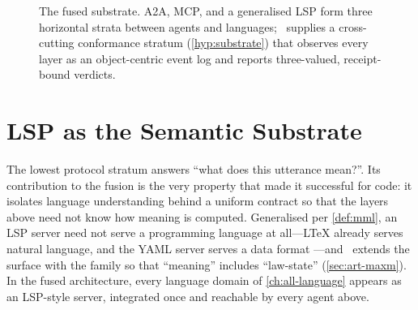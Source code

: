 \begin{figure}[t]
\centering
{}
\caption[The fused substrate]{The fused substrate. A2A, MCP, and a generalised
LSP form three horizontal strata between agents and languages; \lspmax\ supplies a
cross-cutting conformance stratum (\cref{hyp:substrate}) that observes every layer
as an object-centric event log and reports three-valued, receipt-bound verdicts.}
\label{fig:stack}
\end{figure}

\section{LSP as the Semantic Substrate}
\label{sec:fus-lsp}

The lowest protocol stratum answers ``what does this utterance mean?''. Its
contribution to the fusion is the very property that made it successful for code:
it isolates language understanding behind a uniform contract so that the layers
above need not know how meaning is computed. Generalised per \cref{def:mml}, an
LSP server need not serve a programming language at all---LTeX already serves
natural language, and the YAML server serves a data format
\citep{ltex,yamlls}---and \lspmax\ extends the surface with the \maxm{*} family so
that ``meaning'' includes ``law-state'' (\cref{sec:art-maxm}). In the fused
architecture, every language domain of \cref{ch:all-language} appears as an
LSP-style server, integrated once and reachable by every agent above.

